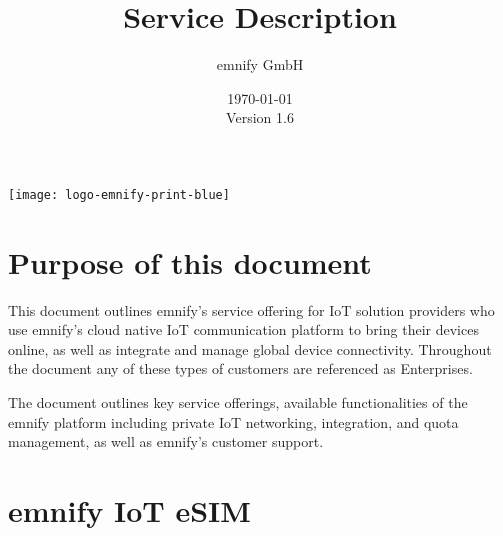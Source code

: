 \documentclass[11pt, oneside]{article}   	%
\newcommand{\addspace}{\vspace{2mm}}
\begin{document}
\title{Service Description}
\author{emnify GmbH}
\date{\today \\ \addspace Version 1.6}
\maketitle

\begin{center}
  \texttt{[image: logo-emnify-print-blue]}
\end{center}

\pagebreak[4]

\tableofcontents

\pagebreak[4]

\section{Purpose of this document}

\begin{markdown}

This document outlines emnify's service offering for IoT solution providers who use emnify's cloud native IoT communication platform to bring their devices online, as well as integrate and manage global device connectivity.
Throughout the document any of these types of customers are referenced as Enterprises. 

The document outlines key service offerings, available functionalities of the emnify platform including private IoT networking, integration, and quota management, as well as emnify's customer support.  

\end{markdown}

\section{emnify IoT eSIM}
\end{document}
